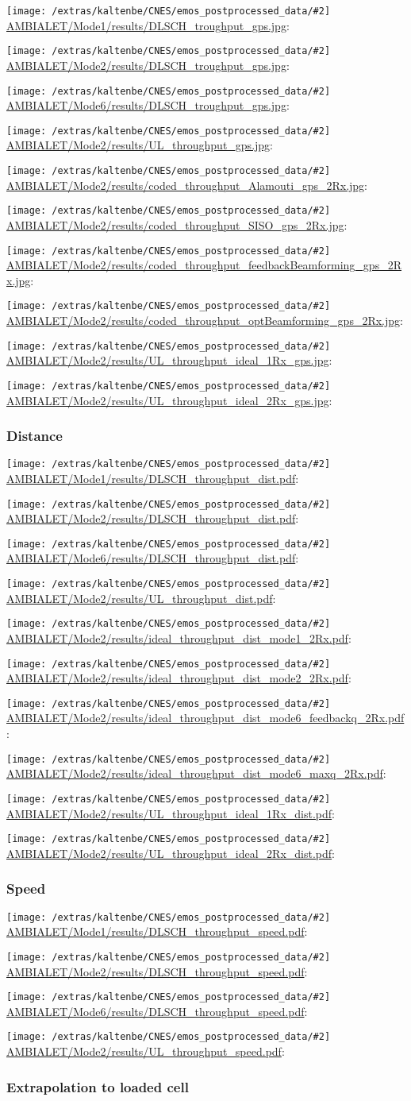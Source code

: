 \documentclass[a4paper,10pt]{article}
\newcommand{\printfile}[2][]{
 \begin{minipage}{8cm}
  \centering
  \texttt{[image: /extras/kaltenbe/CNES/emos\_postprocessed\_data/\#2]}
  \url{#2}: #1

 \end{minipage}
}
\begin{document}
\printfile{AMBIALET/Mode1/results/DLSCH_troughput_gps.jpg}
\printfile{AMBIALET/Mode2/results/DLSCH_troughput_gps.jpg}

\printfile{AMBIALET/Mode6/results/DLSCH_troughput_gps.jpg}
\printfile{AMBIALET/Mode2/results/UL_throughput_gps.jpg}

\printfile{AMBIALET/Mode2/results/coded_throughput_Alamouti_gps_2Rx.jpg}
\printfile{AMBIALET/Mode2/results/coded_throughput_SISO_gps_2Rx.jpg}

\printfile{AMBIALET/Mode2/results/coded_throughput_feedbackBeamforming_gps_2Rx.jpg}
\printfile{AMBIALET/Mode2/results/coded_throughput_optBeamforming_gps_2Rx.jpg}

\printfile{AMBIALET/Mode2/results/UL_throughput_ideal_1Rx_gps.jpg}
\printfile{AMBIALET/Mode2/results/UL_throughput_ideal_2Rx_gps.jpg}

\subsubsection{Distance}

\printfile{AMBIALET/Mode1/results/DLSCH_throughput_dist.pdf}
\printfile{AMBIALET/Mode2/results/DLSCH_throughput_dist.pdf}

\printfile{AMBIALET/Mode6/results/DLSCH_throughput_dist.pdf}
\printfile{AMBIALET/Mode2/results/UL_throughput_dist.pdf}

\printfile{AMBIALET/Mode2/results/ideal_throughput_dist_mode1_2Rx.pdf}
\printfile{AMBIALET/Mode2/results/ideal_throughput_dist_mode2_2Rx.pdf}

\printfile{AMBIALET/Mode2/results/ideal_throughput_dist_mode6_feedbackq_2Rx.pdf}
\printfile{AMBIALET/Mode2/results/ideal_throughput_dist_mode6_maxq_2Rx.pdf}

\printfile{AMBIALET/Mode2/results/UL_throughput_ideal_1Rx_dist.pdf}
\printfile{AMBIALET/Mode2/results/UL_throughput_ideal_2Rx_dist.pdf}

\subsubsection{Speed}

\printfile{AMBIALET/Mode1/results/DLSCH_throughput_speed.pdf}
\printfile{AMBIALET/Mode2/results/DLSCH_throughput_speed.pdf}

\printfile{AMBIALET/Mode6/results/DLSCH_throughput_speed.pdf}
\printfile{AMBIALET/Mode2/results/UL_throughput_speed.pdf}

\subsubsection{Extrapolation to loaded cell}
\end{document}
